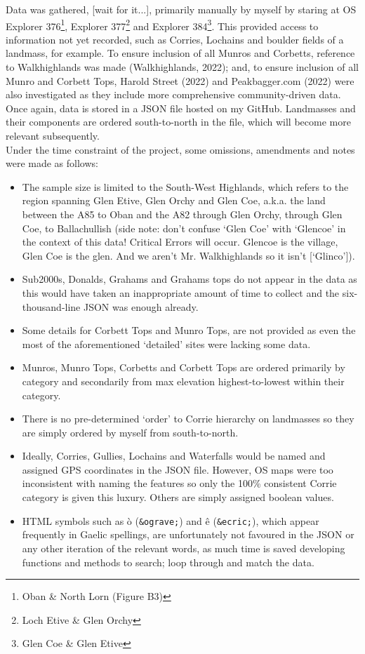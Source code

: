 \documentclass[11pt, english]{article}
\begin{document}
	Data was gathered, [wait for it...], primarily manually by myself by staring at OS Explorer 376\footnote{Oban \& North Lorn (Figure B3)}, Explorer 377\footnote{Loch Etive \& Glen Orchy} and Explorer 384\footnote{Glen Coe \& Glen Etive}. This provided access to information not yet recorded, such as Corries, Lochains and boulder fields of a landmass, for example. To ensure inclusion of all Munros and Corbetts, reference to Walkhighlands was made (Walkhighlands, 2022); and, to ensure inclusion of all Munro and Corbett Tops, Harold Street (2022) and Peakbagger.com (2022) were also investigated as they include more comprehensive community-driven data. Once again, data is stored in a JSON file hosted on my GitHub. Landmasses and their components are ordered south-to-north in the file, which will become more relevant subsequently.\\

	Under the time constraint of the project, some omissions, amendments and notes were made as follows:

	\begin{itemize}
	\setlength\itemsep{0cm}
		\item The sample size is limited to the South-West Highlands, which refers to the region spanning Glen Etive, Glen Orchy and Glen Coe, a.k.a. the land between the A85 to Oban and the A82 through Glen Orchy, through Glen Coe, to Ballachullish (side note: don't confuse `Glen Coe' with `Glencoe' in the context of this data! Critical Errors will occur. Glencoe is the village, Glen Coe is the glen. And we aren't Mr. Walkhighlands so it isn't [`Glinco']).
		\item Sub2000s, Donalds, Grahams and Grahams tops do not appear in the data as this would have taken an inappropriate amount of time to collect and the six-thousand-line JSON was enough already.
		\item Some details for Corbett Tops and Munro Tops, are not provided as even the most of the aforementioned `detailed' sites were lacking some data.
		\item Munros, Munro Tops, Corbetts and Corbett Tops are ordered primarily by category and secondarily from max elevation highest-to-lowest within their category.
		\item There is no pre-determined `order' to Corrie hierarchy on landmasses so they are simply ordered by myself from south-to-north.
		\item Ideally, Corries, Gullies, Lochains and Waterfalls would be named and assigned GPS coordinates in the JSON file. However, OS maps were too inconsistent with naming the features so only the 100\% consistent Corrie category is given this luxury. Others are simply assigned boolean values.
		\item HTML symbols such as \`{o} (\verb|&ograve;|) and \^{e} (\verb|&ecric;|), which appear frequently in Gaelic spellings, are unfortunately not favoured in the JSON or any other iteration of the relevant words, as much time is saved developing functions and methods to search; loop through and match the data.
	\end{itemize}
\end{document}
